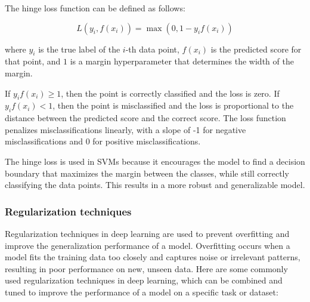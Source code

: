 The hinge loss function can be defined as follows:

\begin{equation}
	L(y_i, f(x_i)) = \max(0, 1 - y_i f(x_i))
\end{equation}

where $y_i$ is the true label of the $i$-th data point, $f(x_i)$ is the predicted score for that point, and $1$ is a margin hyperparameter that determines the width of the margin.

If $y_i f(x_i) \geq 1$, then the point is correctly classified and the loss is zero. If $y_i f(x_i) < 1$, then the point is misclassified and the loss is proportional to the distance between the predicted score and the correct score. The loss function penalizes misclassifications linearly, with a slope of -1 for negative misclassifications and 0 for positive misclassifications.

The hinge loss is used in SVMs because it encourages the model to find a decision boundary that maximizes the margin between the classes, while still correctly classifying the data points. This results in a more robust and generalizable model.

\subsubsection{Regularization techniques}
\label{subsubsec:3_regularization}

Regularization techniques in deep learning are used to prevent overfitting and improve the generalization performance of a model. Overfitting occurs when a model fits the training data too closely and captures noise or irrelevant patterns, resulting in poor performance on new, unseen data. Here are some commonly used regularization techniques in deep learning, which can be combined and tuned to improve the performance of a model on a specific task or dataset:

